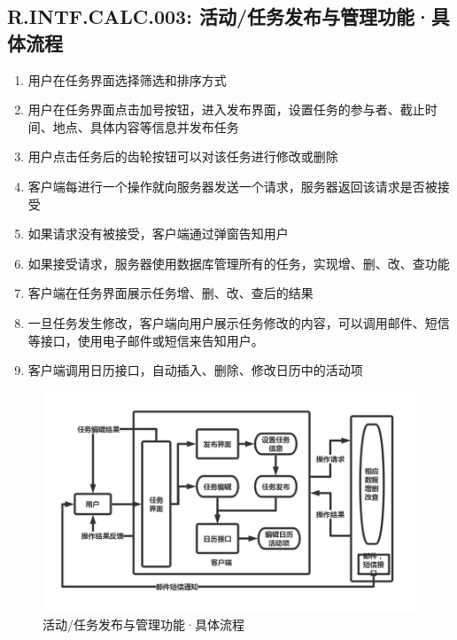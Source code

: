     \subsection{R.INTF.CALC.003: 活动/任务发布与管理功能·具体流程}
    \begin{enumerate}
        \item 用户在任务界面选择筛选和排序方式
        \item 用户在任务界面点击加号按钮，进入发布界面，设置任务的参与者、截止时间、地点、具体内容等信息并发布任务
        \item 用户点击任务后的齿轮按钮可以对该任务进行修改或删除
        \item 客户端每进行一个操作就向服务器发送一个请求，服务器返回该请求是否被接受
        \item 如果请求没有被接受，客户端通过弹窗告知用户
        \item 如果接受请求，服务器使用数据库管理所有的任务，实现增、删、改、查功能
        \item 客户端在任务界面展示任务增、删、改、查后的结果
        \item 一旦任务发生修改，客户端向用户展示任务修改的内容，可以调用邮件、短信等接口，使用电子邮件或短信来告知用户。
        \item 客户端调用日历接口，自动插入、删除、修改日历中的活动项
    \end{enumerate}
        \begin{figure}[h]
            \centering
            \includegraphics[scale=0.4]{OutlineDesign/figures/活动任务发布与管理功能·具体流程.png}
            \caption{活动/任务发布与管理功能·具体流程}
            \label{fig:server_flow}
        \end{figure}
